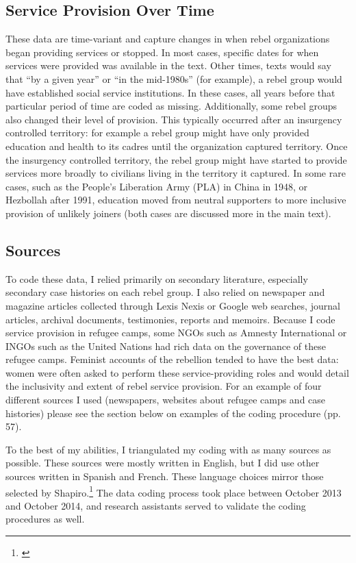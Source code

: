 \documentclass[12pt, letterpaper]{article}
\begin{document}
\subsection*{Service Provision Over Time}  

These data are time-variant and capture changes in when rebel organizations began providing services or stopped. In most cases, specific dates for when services were provided was available in the text. Other times, texts would say that ``by a given year'' or ``in the mid-1980s'' (for example), a rebel group would have established social service institutions. In these cases, all years before that particular period of time are coded as missing. Additionally, some rebel groups also changed their level of provision. This typically occurred after an insurgency controlled territory: for example a rebel group might have only provided education and health to its cadres until the organization captured territory. Once the insurgency controlled territory, the rebel group might have started to provide services more broadly to civilians living in the territory it captured. In some rare cases, such as the People's Liberation Army (PLA) in China in 1948, or Hezbollah after 1991, education moved from neutral supporters to more inclusive provision of unlikely joiners (both cases are discussed more in the main text).

\subsection*{Sources}  

To code these data, I relied primarily on secondary literature, especially secondary case histories on each rebel group. I also relied on newspaper and magazine articles collected through Lexis Nexis or Google web searches, journal articles, archival documents, testimonies, reports and memoirs. Because I code service provision in refugee camps, some NGOs such as Amnesty International or INGOs such as the United Nations had rich data on the governance of these refugee camps. Feminist accounts of the rebellion tended to have the best data: women were often asked to perform these service-providing roles and would detail the inclusivity and extent of rebel service provision. For an example of four different sources I used (newspapers, websites about refugee camps and case histories) please see the section below on examples of the coding procedure (pp. 57).  

To the best of my abilities, I triangulated my coding with as many sources as possible. These sources were mostly written in English, but I did use other sources written in Spanish and French. These language choices mirror those selected by Shapiro.\footnote{\citealt{shapiro2013terrorist}} The data coding process took place between October 2013 and October 2014, and research assistants served to validate the coding procedures as well. 
\end{document}
